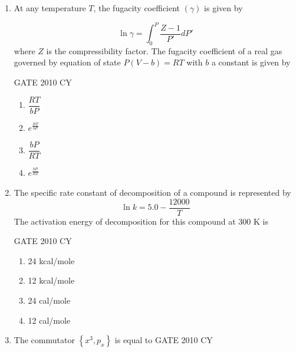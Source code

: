 \documentclass[journal,12pt,onecolumn]{IEEEtran}
\theoremstyle{remark}
\begin{document}
\begin{enumerate}
\begin{multicols}{2}
\begin{enumerate}
    \item $-12.74~\mathrm{J~K^{-1}~mole^{-1}}$
    \item $-6.37~\mathrm{J~K^{-1}~mole^{-1}}$
    \item $6.37~\mathrm{J~K^{-1}~mole^{-1}}$
    \item $12.74~\mathrm{J~K^{-1}~mole^{-1}}$
\end{enumerate}
\end{multicols}

\item At any temperature $T$, the fugacity coefficient $(\gamma)$ is given by

\[
\ln \gamma = \int_0^P \frac{Z-1}{P'} dP'
\]
where $Z$ is the compressibility factor. The fugacity coefficient of a real gas governed by equation of state $P(V-b)=RT$ with $b$ a constant is given by

\hfill{GATE 2010 CY}
\begin{multicols}{2}
\begin{enumerate}
    \item $\dfrac{RT}{bP}$
    \item $e^{\frac{RT}{bP}}$
    \item $\dfrac{bP}{RT}$
    \item $e^{\frac{bP}{RT}}$
\end{enumerate}
\end{multicols}

\item The specific rate constant of decomposition of a compound is represented by\\
\[
\ln k = 5.0 - \frac{12000}{T}
\]
The activation energy of decomposition for this compound at 300 K is

\hfill{GATE 2010 CY}
\begin{multicols}{2}
\begin{enumerate}
    \item 24 kcal/mole
    \item 12 kcal/mole
    \item 24 cal/mole
    \item 12 cal/mole
\end{enumerate}
\end{multicols}

\item The commutator $\left\{ x^3, p_x \right\}$ is equal to
\hfill{GATE 2010 CY}


\end{enumerate}
\end{document}
